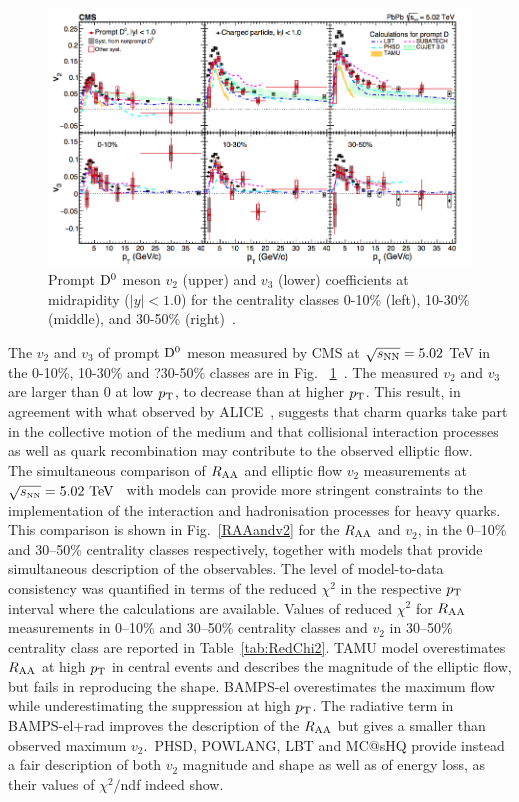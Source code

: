 \begin{figure}[!ht]
  \centering
        \includegraphics[width=14cm]{FigCap2/D0v2_CMS_5TeV.png}
  \caption{Prompt ${\rm D^0}$ meson $v_2$ (upper) and $v_3$ (lower) coefficients at midrapidity ($|y| < 1.0$) for
the centrality classes 0-10\% (left), 10-30\% (middle), and 30-50\% (right)~\cite{Sirunyan:2017plt}.}
  \label{fig:D0v2CMS}
\end{figure}

The $v_2$ and $v_3$ of prompt ${\rm D^0}$ meson measured by CMS at $\sqrt{s_{\rm NN}} = 5.02 $ TeV in the 0-10\%, 
10-30\% and ?30-50\% classes are in Fig.~	\ref{fig:D0v2CMS}~\cite{Sirunyan:2017plt}. The measured $v_2$ and $v_3$ are larger than 0 
at low $p_{\rm T}$, to decrease than at higher $p_{\rm T}$.
This result, in agreement with what observed by ALICE~\cite{Acharya:2017qps}, suggests that charm quarks take part in 
the collective motion of the medium and that collisional interaction processes as well as quark 
recombination may contribute to the observed elliptic flow. \\

The simultaneous comparison of $R_{\rm AA}$ and elliptic flow $v_2$ measurements at $\sqrt{s_{\rm \scriptscriptstyle NN}}=5.02~\mathrm{TeV}$~\cite{Acharya:2017qps} with models can provide more stringent constraints to the implementation of the interaction and hadronisation processes for heavy quarks. 
This comparison is shown in Fig.~\ref{RAAandv2} for the $R_{\rm AA}$  
and $v_2$, in the 0--10\% and 30--50\% centrality classes respectively, together with models that provide simultaneous description of the observables.
The level of model-to-data consistency was quantified in terms of the reduced $\chi^2$ in the respective $p_{\rm T}$ interval where the calculations are available.
Values of reduced $\chi^2$ for $R_{\rm AA}$ measurements in 0--10\% and 30--50\% centrality classes and $v_2$ in 30--50\% centrality class are reported in Table~\ref{tab:RedChi2}.
TAMU model overestimates $R_{\rm AA}$ at high $p_{\rm T}$ in central events and describes the magnitude of the elliptic flow, but fails in reproducing the shape.
BAMPS-el overestimates the maximum flow while underestimating the suppression at high $p_{\rm T}$. The radiative term in BAMPS-el+rad improves the description of the $R_{\rm AA}$ but gives a smaller than observed maximum $v_2$.~PHSD, POWLANG, LBT and MC@sHQ provide instead a fair description of both $v_2$ magnitude and shape
as well as of energy loss, as their values of $\chi^2/$ndf indeed show. 





